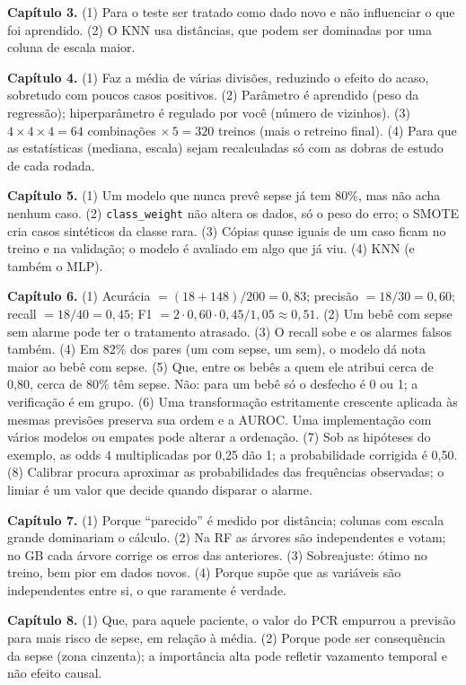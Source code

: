 \documentclass[11pt,a4paper]{article}
\newcommand{\cod}[1]{\texttt{#1}}
\begin{document}
\textbf{Capítulo 3.}
(1) Para o teste ser tratado como dado novo e não influenciar o que foi aprendido.
(2) O KNN usa distâncias, que podem ser dominadas por uma coluna de escala maior.

\textbf{Capítulo 4.}
(1) Faz a média de várias divisões, reduzindo o efeito do acaso, sobretudo com poucos casos positivos.
(2) Parâmetro é aprendido (peso da regressão); hiperparâmetro é regulado por você (número de vizinhos).
(3) $4\times4\times4=64$ combinações $\times\,5 = 320$ treinos (mais o retreino final).
(4) Para que as estatísticas (mediana, escala) sejam recalculadas só com as dobras de estudo de cada rodada.

\textbf{Capítulo 5.}
(1) Um modelo que nunca prevê sepse já tem 80\%, mas não acha nenhum caso.
(2) \cod{class\_weight} não altera os dados, só o peso do erro; o SMOTE cria casos sintéticos da classe rara.
(3) Cópias quase iguais de um caso ficam no treino e na validação; o modelo é avaliado em algo que já viu.
(4) KNN (e também o MLP).

\textbf{Capítulo 6.}
(1) Acurácia $=(18+148)/200=0{,}83$; precisão $=18/30=0{,}60$; recall $=18/40=0{,}45$; F1 $=2\cdot0{,}60\cdot0{,}45/1{,}05\approx0{,}51$.
(2) Um bebê com sepse sem alarme pode ter o tratamento atrasado.
(3) O recall sobe e os alarmes falsos também.
(4) Em 82\% dos pares (um com sepse, um sem), o modelo dá nota maior ao bebê com sepse.
(5) Que, entre os bebês a quem ele atribui cerca de 0,80, cerca de 80\% têm sepse. Não: para um bebê só o desfecho é 0 ou 1; a verificação é em grupo.
(6) Uma transformação estritamente crescente aplicada às mesmas previsões preserva sua ordem e a AUROC. Uma implementação com vários modelos ou empates pode alterar a ordenação.
(7) Sob as hipóteses do exemplo, as odds $4$ multiplicadas por 0,25 dão 1; a probabilidade corrigida é 0,50.
(8) Calibrar procura aproximar as probabilidades das frequências observadas; o limiar é um valor que decide quando disparar o alarme.

\textbf{Capítulo 7.}
(1) Porque ``parecido'' é medido por distância; colunas com escala grande dominariam o cálculo.
(2) Na RF as árvores são independentes e votam; no GB cada árvore corrige os erros das anteriores.
(3) Sobreajuste: ótimo no treino, bem pior em dados novos.
(4) Porque supõe que as variáveis são independentes entre si, o que raramente é verdade.

\textbf{Capítulo 8.}
(1) Que, para aquele paciente, o valor do PCR empurrou a previsão para mais risco de sepse, em relação à média.
(2) Porque pode ser consequência da sepse (zona cinzenta); a importância alta pode refletir vazamento temporal e não efeito causal.
\end{document}
